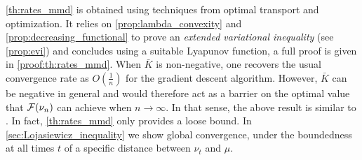 \cref{th:rates_mmd} is obtained using techniques from optimal transport and optimization. It relies on \cref{prop:lambda_convexity} and \cref{prop:decreasing_functional} to prove an \textit{extended variational inequality} (see \cref{prop:evi}) and concludes using a suitable Lyapunov function, a full proof is given in \cref{proof:th:rates_mmd}.
When $\bar{K}$ is non-negative, one recovers the usual convergence rate as $O(\frac{1}{n})$ for the gradient descent algorithm. However, $\bar{K}$ can be negative in general and would therefore act as a barrier on the optimal value that ${{\mathcal F}}(\nu_n)$ can achieve when $n\rightarrow \infty$. In that sense, the above result is similar to \cite[Theorem 6.9]{Bottou:2017}. In fact, \cref{th:rates_mmd} only provides a loose bound. In \cref{sec:Lojasiewicz_inequality} we show global convergence, under the boundedness at all times $t$ of a specific distance between $\nu_t$ and $\mu$.



